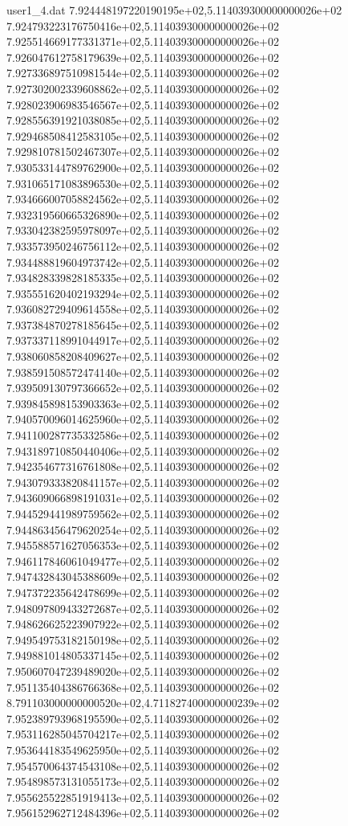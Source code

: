 \begin{filecontents}{user1_4.dat}
7.924448197220190195e+02,5.114039300000000026e+02
7.924793223176750416e+02,5.114039300000000026e+02
7.925514669177331371e+02,5.114039300000000026e+02
7.926047612758179639e+02,5.114039300000000026e+02
7.927336897510981544e+02,5.114039300000000026e+02
7.927302002339608862e+02,5.114039300000000026e+02
7.928023906983546567e+02,5.114039300000000026e+02
7.928556391921038085e+02,5.114039300000000026e+02
7.929468508412583105e+02,5.114039300000000026e+02
7.929810781502467307e+02,5.114039300000000026e+02
7.930533144789762900e+02,5.114039300000000026e+02
7.931065171083896530e+02,5.114039300000000026e+02
7.934666007058824562e+02,5.114039300000000026e+02
7.932319560665326890e+02,5.114039300000000026e+02
7.933042382595978097e+02,5.114039300000000026e+02
7.933573950246756112e+02,5.114039300000000026e+02
7.934488819604973742e+02,5.114039300000000026e+02
7.934828339828185335e+02,5.114039300000000026e+02
7.935551620402193294e+02,5.114039300000000026e+02
7.936082729409614558e+02,5.114039300000000026e+02
7.937384870278185645e+02,5.114039300000000026e+02
7.937337118991044917e+02,5.114039300000000026e+02
7.938060858208409627e+02,5.114039300000000026e+02
7.938591508572474140e+02,5.114039300000000026e+02
7.939509130797366652e+02,5.114039300000000026e+02
7.939845898153903363e+02,5.114039300000000026e+02
7.940570096014625960e+02,5.114039300000000026e+02
7.941100287735332586e+02,5.114039300000000026e+02
7.943189710850440406e+02,5.114039300000000026e+02
7.942354677316761808e+02,5.114039300000000026e+02
7.943079333820841157e+02,5.114039300000000026e+02
7.943609066898191031e+02,5.114039300000000026e+02
7.944529441989759562e+02,5.114039300000000026e+02
7.944863456479620254e+02,5.114039300000000026e+02
7.945588571627056353e+02,5.114039300000000026e+02
7.946117846061049477e+02,5.114039300000000026e+02
7.947432843045388609e+02,5.114039300000000026e+02
7.947372235642478699e+02,5.114039300000000026e+02
7.948097809433272687e+02,5.114039300000000026e+02
7.948626625223907922e+02,5.114039300000000026e+02
7.949549753182150198e+02,5.114039300000000026e+02
7.949881014805337145e+02,5.114039300000000026e+02
7.950607047239489020e+02,5.114039300000000026e+02
7.951135404386766368e+02,5.114039300000000026e+02
8.791103000000000520e+02,4.711827400000000239e+02
7.952389793968195590e+02,5.114039300000000026e+02
7.953116285045704217e+02,5.114039300000000026e+02
7.953644183549625950e+02,5.114039300000000026e+02
7.954570064374543108e+02,5.114039300000000026e+02
7.954898573131055173e+02,5.114039300000000026e+02
7.955625522851919413e+02,5.114039300000000026e+02
7.956152962712484396e+02,5.114039300000000026e+02

\end{filecontents}

